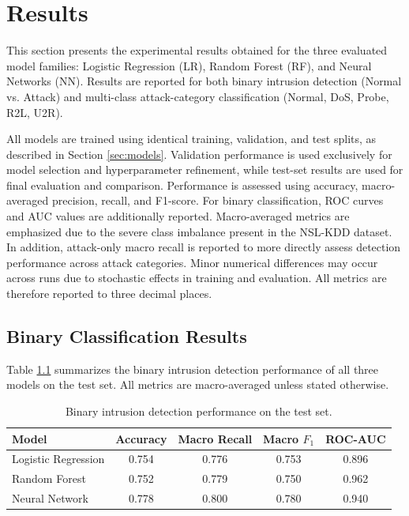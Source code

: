 \chapter{Results}
\label{sec:results}

This section presents the experimental results obtained for the three evaluated model families: Logistic Regression (LR), Random Forest (RF), and Neural Networks (NN). 
Results are reported for both binary intrusion detection (Normal vs. Attack) and multi-class attack-category classification (Normal, DoS, Probe, R2L, U2R).

All models are trained using identical training, validation, and test splits, as described in Section \ref{sec:models}. Validation performance is used exclusively for 
model selection and hyperparameter refinement, while test-set results are used for final evaluation and comparison. Performance is assessed using accuracy, macro-averaged 
precision, recall, and F1-score. For binary classification, ROC curves and AUC values are additionally reported. Macro-averaged metrics are emphasized due to the severe class 
imbalance present in the NSL-KDD dataset. In addition, attack-only macro recall is reported to more directly assess detection performance across attack categories.
Minor numerical differences may occur across runs due to stochastic effects in training and evaluation. All metrics are therefore reported to three decimal places.

\section{Binary Classification Results}

Table \ref{tab:binary_results} summarizes the binary intrusion detection performance of all three models on the test set. All metrics are macro-averaged unless stated otherwise.
\begin{table}[htbp]
\centering
\caption{Binary intrusion detection performance on the test set.}
\label{tab:binary_results}
\begin{tabular}{lcccc}
\toprule
Model & Accuracy & Macro Recall & Macro $F_1$ & ROC-AUC \\
\midrule
Logistic Regression & 0.754 & 0.776 & 0.753 & 0.896 \\
Random Forest       & 0.752 & 0.779 & 0.750 & 0.962 \\
Neural Network      & 0.778 & 0.800 & 0.780 & 0.940 \\
\bottomrule
\end{tabular}
\end{table}

